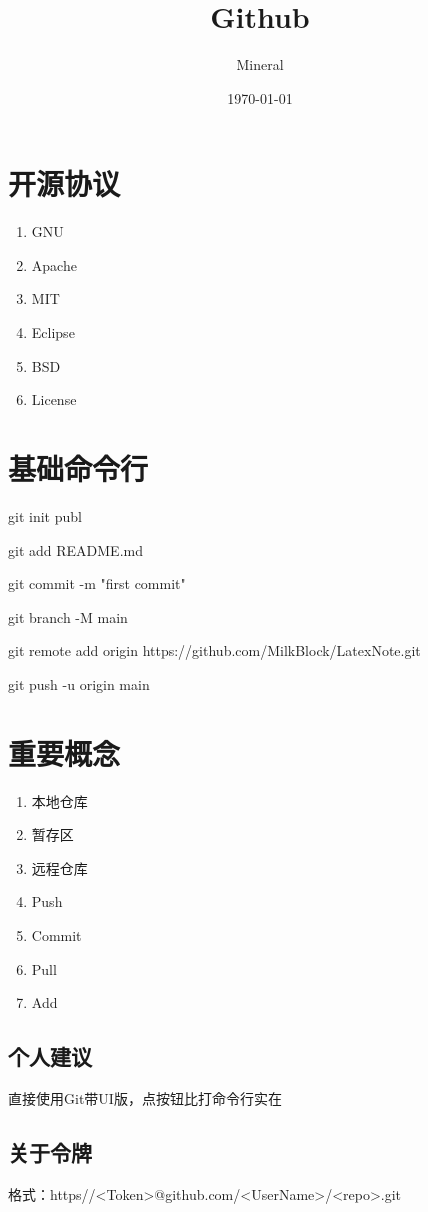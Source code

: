 \documentclass[utf8]{ctexart}
\author{Mineral}
\title{Github}
\date {\today}
\begin{document}
		\maketitle
		\section{开源协议}
		\begin{enumerate}
				\item GNU
				\item Apache
				\item MIT
				\item Eclipse
				\item BSD
				\item License
		\end{enumerate}		
		\section{基础命令行}
	    \par git init publ
		\par git add README.md
		\par git commit -m "first commit"
		\par git branch -M main
		\par git remote add origin https://github.com/MilkBlock/LatexNote.git
		\par git push -u origin main
		\section{重要概念}
		\begin{enumerate}
				\item 本地仓库
				\item 暂存区
				\item 远程仓库
		        \item Push
				\item Commit
			    \item Pull
            	\item Add
		\end{enumerate}
		\subsection{个人建议}
		\par 直接使用Git带UI版，点按钮比打命令行实在
		\subsection{关于令牌}
		\par 格式：https//<Token>@github.com/<UserName>/<repo>.git
\end{document}
